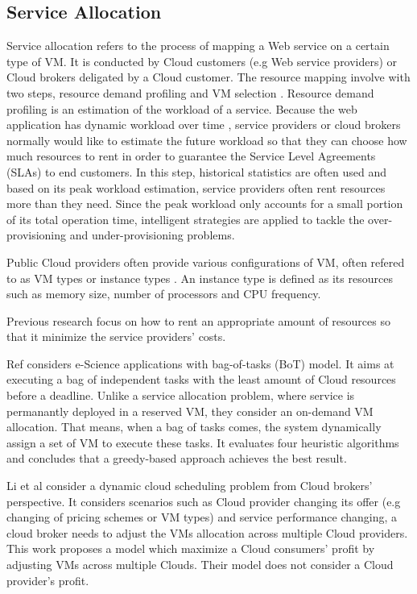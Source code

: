 \subsection*{Service Allocation}
Service allocation refers to the process of mapping a Web service on a certain type of VM.
It is conducted by Cloud customers (e.g Web service providers) or Cloud brokers deligated by a 
Cloud customer.
The resource mapping involve with two steps, 
resource demand profiling \cite{} and VM selection \cite{}. 
Resource demand profiling is an estimation of the workload of a service. 
Because the web application has dynamic workload over time \cite{}, 
service providers or cloud brokers normally would like to estimate the future workload so that they 
can choose how much resources to rent in order to guarantee the 
Service Level Agreements (SLAs)  \cite{} to end customers. In this step, historical statistics
are often used and based on its peak workload estimation, service providers often
rent resources more than they need. Since the peak workload only accounts for a small portion
of its total operation time, intelligent strategies are applied to tackle the over-provisioning and 
under-provisioning problems.

Public Cloud providers often provide various configurations of VM, 
often refered to as VM types or instance types \cite{Li:2011ti}. 
An instance type is defined as its resources such as memory size, number of processors and 
CPU frequency. 

Previous research focus on how to rent an appropriate amount of resources so that it minimize the 
service providers' costs.

Ref \cite{Candeia:2010wt} considers e-Science applications with bag-of-tasks (BoT) model. It
aims at executing a bag of independent tasks with the least amount of Cloud resources before
a deadline.
Unlike a service allocation problem, where service is permanantly deployed in a reserved VM, 
they consider an on-demand VM allocation. 
That means, when a bag of tasks comes, the system
dynamically assign a set of VM to execute these tasks. 
It evaluates four heuristic algorithms and 
concludes that a greedy-based approach achieves the best result.

Li et al \cite{Li:2011ti} consider a dynamic cloud scheduling problem 
from Cloud brokers' perspective. It considers scenarios such as Cloud provider changing its offer 
(e.g changing of pricing schemes or VM types) and service performance changing, 
a cloud broker needs to adjust the VMs allocation across multiple Cloud providers. 
This work proposes a model which maximize a Cloud consumers' profit by adjusting VMs across
multiple Clouds. Their model does not consider a Cloud provider's profit.




